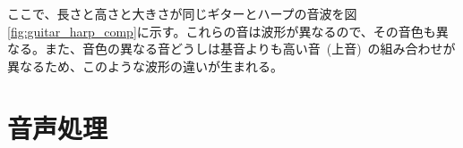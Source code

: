 ここで、長さと高さと大きさが同じギターとハープの音波を図\ref{fig:guitar_harp_comp}に示す。これらの音は波形が異なるので、その音色も異なる。また、音色の異なる音どうしは基音よりも高い音~(上音)~の組み合わせが異なるため、このような波形の違いが生まれる。

\section{音声処理}
\label{sec:preprocess}

